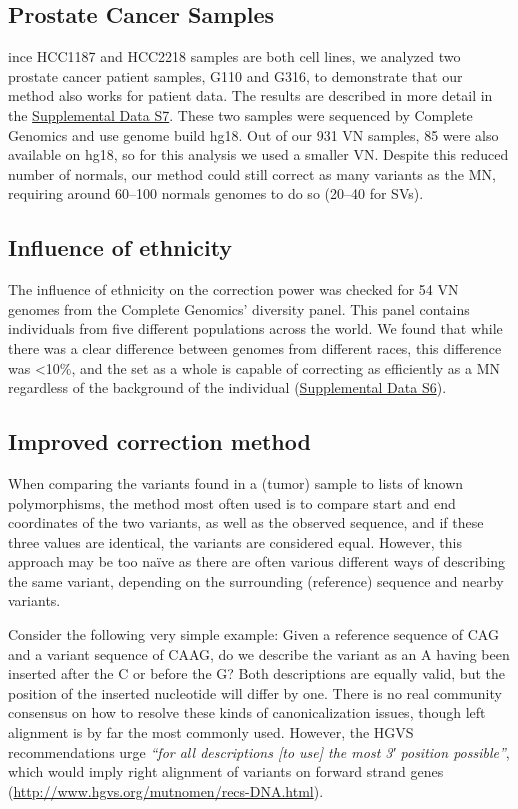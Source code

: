 \subsection*{Prostate Cancer Samples}
ince HCC1187 and HCC2218 samples are both cell lines, we analyzed two prostate cancer patient samples, G110 and G316, to demonstrate that our method also works for patient data. The results are described in more detail in the \href{https://genome.cshlp.org/content/25/9/1382/suppl/DC1}{Supplemental Data S7}. These two samples were sequenced by Complete Genomics and use genome build hg18. Out of our 931 VN samples, 85 were also available on hg18, so for this analysis we used a smaller VN\@. Despite this reduced number of normals, our method could still correct as many variants as the MN, requiring around 60–100 normals genomes to do so (20–40 for SVs).


\subsection*{Influence of ethnicity}

The influence of ethnicity on the correction power was checked for 54 VN genomes from the Complete Genomics’ diversity panel. This panel contains individuals from five different populations across the world. We found that while there was a clear difference between genomes from different races, this difference was <10\%, and the set as a whole is capable of correcting as efficiently as a MN regardless of the background of the individual (\href{https://genome.cshlp.org/content/25/9/1382/suppl/DC1}{Supplemental Data S6}).

\subsection*{Improved correction method}

When comparing the variants found in a (tumor) sample to lists of known polymorphisms, the method most often used is to compare start and end coordinates of the two variants, as well as the observed sequence, and if these three values are identical, the variants are considered equal. However, this approach may be too naïve as there are often various different ways of describing the same variant, depending on the surrounding (reference) sequence and nearby variants.

Consider the following very simple example: Given a reference sequence of CAG and a variant sequence of CAAG, do we describe the variant as an A having been inserted after the C or before the G? Both descriptions are equally valid, but the position of the inserted nucleotide will differ by one. There is no real community consensus on how to resolve these kinds of canonicalization issues, though left alignment is by far the most commonly used. However, the HGVS recommendations urge \textit{“for all descriptions [to use] the most 3′ position possible”}, which would imply right alignment of variants on forward strand genes (\url{http://www.hgvs.org/mutnomen/recs-DNA.html}).

